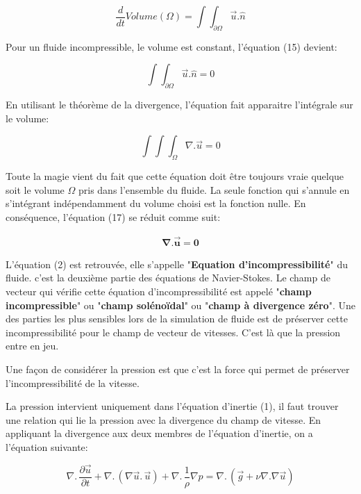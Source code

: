 \documentclass[11pt]{report}
\begin{document}
\begin{equation}
\frac{d}{dt} Volume(\Omega) = \int \!\!\!\! \int_{\partial \Omega} \overrightarrow{u} . \hat{n}
\end{equation}

Pour un fluide incompressible, le volume est constant, l'équation (15) devient:

\begin{equation}
\int \!\!\!\! \int_{\partial \Omega} \overrightarrow{u} . \hat{n} = 0
\end{equation}

En utilisant le théorème de la divergence, l'équation fait apparaitre l'intégrale sur le volume:

\begin{equation}
\int \!\!\!\! \int \!\!\!\! \int_{\Omega} \nabla . \overrightarrow{u} = 0
\end{equation}

Toute la magie vient du fait que cette équation doit être toujours vraie quelque soit le volume $ \Omega $ pris dans l'ensemble du fluide. La seule fonction qui s'annule en s'intégrant indépendamment du volume choisi est la fonction nulle. En conséquence, l'équation (17) se réduit comme suit:

\begin{eqnarray*}
\mathbf{\nabla . \overrightarrow{u} = 0}
\end{eqnarray*}

L'équation (2) est retrouvée, elle s'appelle "\textbf{Equation d'incompressibilité}" du fluide. c'est la deuxième partie des équations de Navier-Stokes.
Le champ de vecteur qui vérifie cette équation d'incompressibilité est appelé "\textbf{champ incompressible}" ou "\textbf{champ solénoïdal}" ou "\textbf{champ à divergence zéro}". Une des parties les plus sensibles lors de la simulation de fluide est de préserver cette incompressibilité pour le champ de vecteur de vitesses. C'est là que la pression entre en jeu.

Une façon de considérer la pression est que c'est la force qui permet de préserver l'incompressibilité de la vitesse.

La pression intervient uniquement dans l'équation d'inertie (1), il faut trouver une relation qui lie la pression avec la divergence du champ de vitesse. En appliquant la divergence aux deux membres de l'équation d'inertie, on a l'équation suivante:

\begin{equation}
\nabla . \, \frac{\partial \overrightarrow{u}}{\partial t} + \nabla . \, (\nabla \overrightarrow{u}. \,  \overrightarrow{u}) + \nabla . \, \frac{1}{\rho} \nabla p  =  \nabla . \, (\overrightarrow{g} + \nu \nabla . \nabla \overrightarrow{u})
\end{equation}
\end{document}
